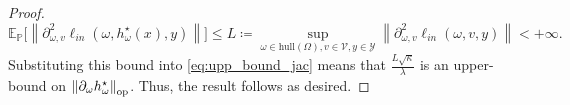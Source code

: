 \begin{proof}
\begin{equation*}
    \mathbb{E}_\mathbb{P}\Big[\left\|\partial_{\omega, v}^2 \ell_{in}(\omega, h^\star_\omega(x), y)\right\|\Big]\leq L\coloneqq\sup_{\omega\in\text{hull}(\Omega),v\in\mathcal{V},y\in\mathcal{Y}}\left\|\partial_{\omega, v}^2 \ell_{in}(\omega, v, y)\right\|<+\infty.
\end{equation*}
Substituting this bound into \cref{eq:upp_bound_jac} means that $\frac{L\sqrt{\kappa}}{\lambda}$ is an upper-bound on $\left\|\partial_\omega h^\star_\omega\right\|_{\operatorname{op}}$. Thus, the result follows as desired.
\end{proof}